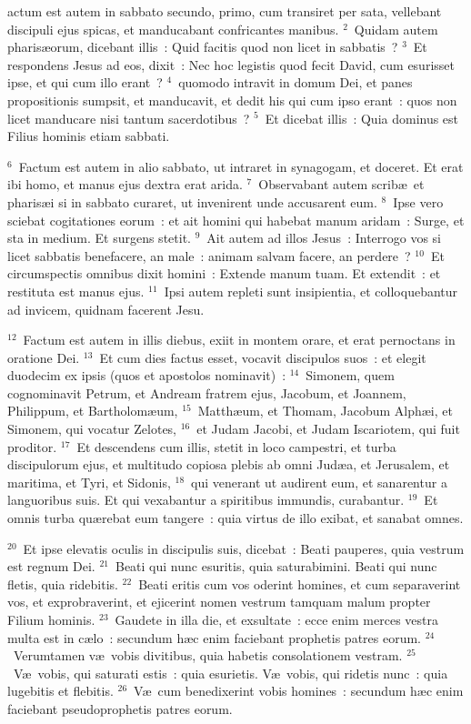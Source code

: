 \bchapter
{}actum est autem in sabbato secundo, primo, cum transiret per sata, vellebant discipuli ejus spicas, et manducabant confricantes manibus.
${}^{2}$~Quidam autem pharis\ae orum, dicebant illis~: Quid facitis quod non licet in sabbatis~?
${}^{3}$~Et respondens Jesus ad eos, dixit~: Nec hoc legistis quod fecit David, cum esurisset ipse, et qui cum illo erant~?
${}^{4}$~quomodo intravit in domum Dei, et panes propositionis sumpsit, et manducavit, et dedit his qui cum ipso erant~: quos non licet manducare nisi tantum sacerdotibus~?
${}^{5}$~Et dicebat illis~: Quia dominus est Filius hominis etiam sabbati.


${}^{6}$~Factum est autem in alio sabbato, ut intraret in synagogam, et doceret. Et erat ibi homo, et manus ejus dextra erat arida.
${}^{7}$~Observabant autem scrib\ae\ et pharis\ae i si in sabbato curaret, ut invenirent unde accusarent eum.
${}^{8}$~Ipse vero sciebat cogitationes eorum~: et ait homini qui habebat manum aridam~: Surge, et sta in medium. Et surgens stetit.
${}^{9}$~Ait autem ad illos Jesus~: Interrogo vos si licet sabbatis benefacere, an male~: animam salvam facere, an perdere~?
${}^{10}$~Et circumspectis omnibus dixit homini~: Extende manum tuam. Et extendit~: et restituta est manus ejus.
${}^{11}$~Ipsi autem repleti sunt insipientia, et colloquebantur ad invicem, quidnam facerent Jesu.


${}^{12}$~Factum est autem in illis diebus, exiit in montem orare, et erat pernoctans in oratione Dei.
${}^{13}$~Et cum dies factus esset, vocavit discipulos suos~: et elegit duodecim ex ipsis (quos et apostolos nominavit)~:
${}^{14}$~Simonem, quem cognominavit Petrum, et Andream fratrem ejus, Jacobum, et Joannem, Philippum, et Bartholom\ae um,
${}^{15}$~Matth\ae um, et Thomam, Jacobum Alph\ae i, et Simonem, qui vocatur Zelotes,
${}^{16}$~et Judam Jacobi, et Judam Iscariotem, qui fuit proditor.
${}^{17}$~Et descendens cum illis, stetit in loco campestri, et turba discipulorum ejus, et multitudo copiosa plebis ab omni Jud\ae a, et Jerusalem, et maritima, et Tyri, et Sidonis,
${}^{18}$~qui venerant ut audirent eum, et sanarentur a languoribus suis. Et qui vexabantur a spiritibus immundis, curabantur.
${}^{19}$~Et omnis turba qu\ae rebat eum tangere~: quia virtus de illo exibat, et sanabat omnes.


${}^{20}$~Et ipse elevatis oculis in discipulis suis, dicebat~: Beati pauperes, quia vestrum est regnum Dei.
${}^{21}$~Beati qui nunc esuritis, quia saturabimini. Beati qui nunc fletis, quia ridebitis.
${}^{22}$~Beati eritis cum vos oderint homines, et cum separaverint vos, et exprobraverint, et ejicerint nomen vestrum tamquam malum propter Filium hominis.
${}^{23}$~Gaudete in illa die, et exsultate~: ecce enim merces vestra multa est in c\ae lo~: secundum h\ae c enim faciebant prophetis patres eorum.
${}^{24}$~Verumtamen v\ae\ vobis divitibus, quia habetis consolationem vestram.
${}^{25}$~V\ae\ vobis, qui saturati estis~: quia esurietis. V\ae\ vobis, qui ridetis nunc~: quia lugebitis et flebitis.
${}^{26}$~V\ae\ cum benedixerint vobis homines~: secundum h\ae c enim faciebant pseudoprophetis patres eorum.


